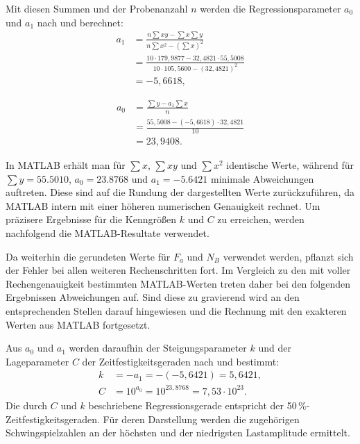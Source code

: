 Mit diesen Summen und der Probenanzahl $n$ werden die Regressionsparameter $a_0$ und $a_1$ nach  und  berechnet: 
\begin{align*}
a_1
&= \frac{n\sum xy-\sum x\sum y}
        {n\sum x^2-\left(\sum x\right)^2} \\[1mm]
&= \frac{10\cdot179{,}9877-32{,}4821\cdot55{,}5008}
        {10\cdot105{,}5600-(32{,}4821)^2} \\
&= -5{,}6618,
\end{align*}

\begin{align*}
a_0
&= \frac{\sum y-a_1\sum x}{n} \\[1mm]
&= \frac{55{,}5008-(-5{,}6618)\cdot32{,}4821}{10} \\
&= 23{,}9408.
\end{align*}

In MATLAB erhält man für $\sum x$, $\sum xy$ und $\sum x^2$ identische Werte, während für $\sum y = 55.5010$, $a_0 = 23.8768$ und $a_1 = -5.6421$ minimale Abweichungen auftreten. Diese sind auf die Rundung der dargestellten Werte zurückzuführen, da MATLAB intern mit einer höheren numerischen Genauigkeit rechnet. Um präzisere Ergebnisse für die Kenngrößen $k$ und $C$ zu erreichen, werden nachfolgend die MATLAB-Resultate verwendet. 

Da weiterhin die gerundeten Werte für $F_{a}$ und $N_{B}$ verwendet werden, pflanzt sich der Fehler bei allen weiteren Rechenschritten fort. Im Vergleich zu den mit voller Rechengenauigkeit bestimmten MATLAB-Werten treten daher bei den folgenden Ergebnissen Abweichungen auf. Sind diese zu gravierend wird an den entsprechenden Stellen darauf hingewiesen und die Rechnung mit den exakteren Werten aus MATLAB fortgesetzt. 

	Aus $a_0$ und $a_1$ werden daraufhin der Steigungsparameter $k$ und der Lageparameter $C$ der Zeitfestigkeitsgeraden nach  und  bestimmt: 
\begin{align*}
k &= -a_1 = -(-5{,}6421) = 5{,}6421, \\
C &= 10^{a_0} = 10^{23{,}8768} = 7{,}53 \cdot 10^{23}.
\end{align*}
	Die durch $C$ und $k$ beschriebene Regressionsgerade entspricht der 50\,\%-Zeitfestigkeitsgeraden. Für deren Darstellung werden die zugehörigen Schwingspielzahlen an der höchsten und der niedrigsten Lastamplitude ermittelt. 
	
	\clearpage
	
